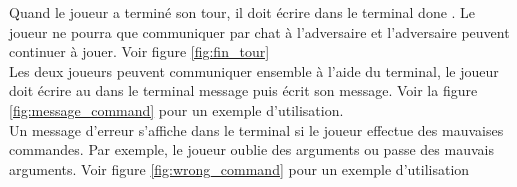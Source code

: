 Quand le joueur a terminé son tour, il doit écrire dans le terminal \og done \fg{}. Le joueur ne pourra que communiquer par chat à l'adversaire et l'adversaire peuvent continuer à jouer. Voir figure \ref{fig:fin_tour}\\





Les deux joueurs peuvent communiquer ensemble  à l'aide du terminal, le joueur doit écrire au dans le terminal \og message \fg{} puis écrit son message. Voir la figure \ref{fig:message_command} pour un exemple d'utilisation. \\


Un message d'erreur s'affiche dans le terminal si le joueur effectue des mauvaises commandes.
Par exemple, le joueur oublie des arguments ou passe des mauvais arguments. Voir figure \ref{fig:wrong_command} pour un exemple d'utilisation\\

